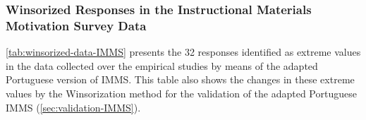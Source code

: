 \subsubsection*{Winsorized Responses in the Instructional Materials Motivation Survey Data}

\autoref{tab:winsorized-data-IMMS} presents the 32 responses identified as extreme values in the data collected over the empirical studies by means of the adapted Portuguese version of IMMS. This table also shows the changes in these extreme values by the Winsorization method for the validation of the adapted Portuguese IMMS (\autoref{sec:validation-IMMS}).

